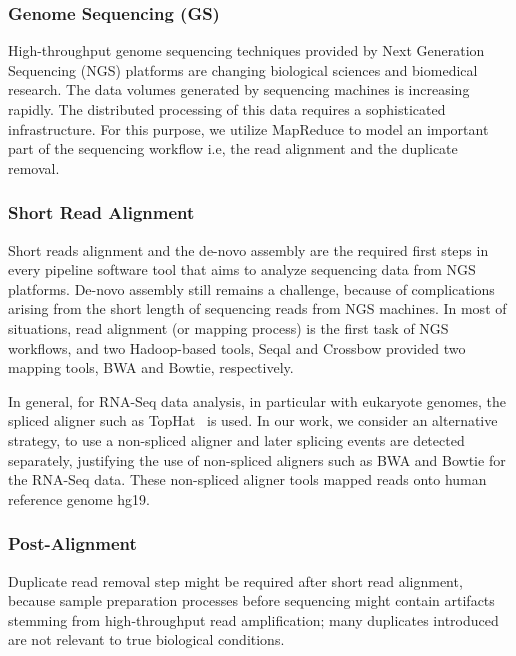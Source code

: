 \documentclass[12pt]{report}
\newcommand{\upp}{\vspace*{-0.5em}}
\begin{document}
\upp
\subsubsection*{Genome Sequencing (GS)}

High-throughput genome sequencing techniques provided by Next Generation
Sequencing (NGS) platforms are changing biological sciences and biomedical
research. The data volumes generated by sequencing machines is increasing
rapidly. The distributed processing of this data requires a sophisticated
infrastructure. For this purpose, we utilize MapReduce to model an important
part of the sequencing workflow i.e, the read alignment and the duplicate
removal. 

\subsubsection*{Short Read Alignment}

Short reads alignment and the de-novo assembly are the required first
steps in every pipeline software tool that aims to analyze sequencing
data from NGS platforms.  De-novo assembly still remains a challenge,
because of complications arising from the short length of sequencing
reads from NGS machines. In most of situations, read alignment (or mapping process)
is the first task of NGS workflows, and two Hadoop-based tools, Seqal and Crossbow provided two mapping tools, BWA and Bowtie, respectively. 

In general, for RNA-Seq data analysis, in particular with eukaryote
genomes, the spliced aligner such as TopHat~\cite{pepke2009} is
used. In our work, we consider an alternative strategy, to use a
non-spliced aligner and later splicing events are detected separately,
justifying the use of non-spliced aligners such as BWA and Bowtie for
the RNA-Seq data.  These non-spliced aligner tools mapped reads onto human reference genome hg19.

\subsubsection*{Post-Alignment}
Duplicate read removal step might be required after short read
alignment, because sample preparation processes before sequencing
might contain artifacts stemming from high-throughput read
amplification; many duplicates introduced are not relevant to true
biological conditions. 
\end{document}
